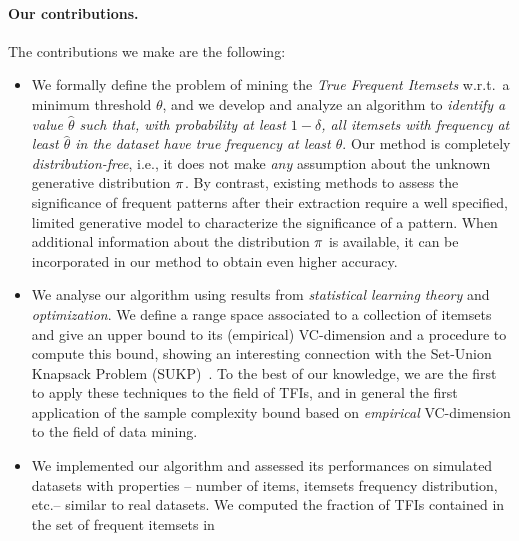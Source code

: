 \paragraph*{Our contributions.}
The contributions we make are the following:
\begin{itemize}
  \item We formally define the problem of mining the \emph{True Frequent
    Itemsets} w.r.t.~a minimum threshold $\theta$, and we develop and analyze an
    algorithm to \emph{identify a value $\hat{\theta}$ such that, with
    probability at least $1-\delta$, all itemsets
with frequency at least $\hat{\theta}$ in the dataset have true frequency
at least $\theta$}. Our method is completely \emph{distribution-free}, i.e., it
does not make \emph{any} assumption about the unknown generative distribution
$\pi$. %
By contrast, existing methods to assess the significance of frequent patterns after their
extraction %
require a well specified, limited generative model to characterize the
significance of a pattern. When %
additional information about the distribution $\pi$ is available, it can be
incorporated in our method to obtain even higher accuracy.
\item %
We analyse our algorithm using results from \emph{statistical learning theory} and \emph{optimization}. %
We define a range space associated to a collection of itemsets and give an upper
bound to its (empirical) VC-dimension and a procedure to compute this bound,
showing an interesting connection with the Set-Union
Knapsack Problem (SUKP)~\citep{GoldschmidtNY94}. 
To the best of our knowledge, we are the first to apply these
techniques to the field of TFIs, and in general the first application of the
sample complexity bound based on \emph{empirical} VC-dimension
to the field of data mining. 
\item We implemented our algorithm and assessed its performances on simulated
  datasets with properties -- number of items, itemsets frequency distribution,
  etc.-- similar to real datasets. We computed the fraction of TFIs contained in the set of frequent itemsets in

\end{itemize}
